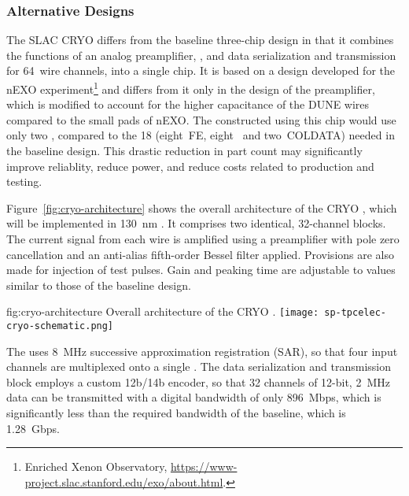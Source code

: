 \subsubsection{Alternative Designs}
\label{sec:fdsp-tpcelec-design-femb-alt}

\label{sec:fdsp-tpcelec-design-femb-alt-cryo}

The SLAC CRYO  differs from the baseline three-chip design in that it combines the functions of an analog preamplifier, , and data serialization and transmission for \num{64}~wire channels, into a single chip.
It is based on a design developed for the nEXO experiment\footnote{Enriched Xenon Observatory, \url{https://www-project.slac.stanford.edu/exo/about.html}.} and differs from it only in the design of the preamplifier, which is modified to account for the higher capacitance of the DUNE  wires compared to the small pads of nEXO.
The  constructed using this chip would use only two , compared to the \num{18} (eight~FE, eight~ and two~COLDATA) needed in the baseline design.
This drastic reduction in part count may significantly improve  reliablity, reduce power, and reduce costs related to production and testing. 

Figure~\ref{fig:cryo-architecture} shows the overall architecture of the CRYO , which will be implemented in \SI{130}{nm} .
It comprises two identical, \num{32}-channel blocks. 
The current signal from each wire is amplified using a preamplifier with pole zero cancellation and an anti-alias fifth-order Bessel filter applied. 
Provisions are also made for injection of test pulses. 
Gain and peaking time are adjustable to values similar to those of the baseline design.

\begin{dunefigure}
{fig:cryo-architecture}
{Overall architecture of the CRYO .}
\texttt{[image: sp-tpcelec-cryo-schematic.png]}
\end{dunefigure}

The  uses \SI{8}{MHz} successive approximation registration (SAR), so that four input channels are multiplexed onto a single . The data serialization and transmission block employs a custom 12b/14b encoder, so that \num{32} channels of \num{12}-bit, \SI{2}{MHz} data can be transmitted with a digital bandwidth of only \SI{896}{Mbps}, which is significantly less than the required bandwidth of the baseline, which is \SI{1.28}{Gbps}.

